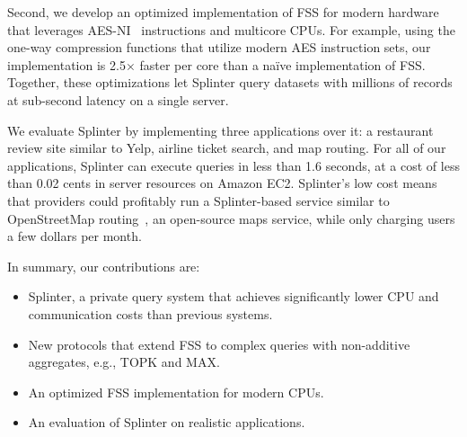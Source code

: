 Second, we develop an optimized implementation of FSS for modern hardware that leverages AES-NI~\cite{aes-ni} instructions and multicore CPUs.
For example, using the one-way compression functions that utilize modern AES instruction sets, our implementation is 2.5$\times$ faster per core than a na\"ive implementation of FSS.
Together, these optimizations let Splinter query datasets with millions of records at sub-second latency on a single server.

We evaluate Splinter by implementing 
three applications over it: a restaurant review site similar to Yelp, 
airline ticket search, and map routing.
For all of our applications, Splinter can execute queries in less than 1.6 seconds, at a cost of less than 0.02 cents in server resources on Amazon EC2.
Splinter's low cost means that providers could profitably run a Splinter-based service
similar to OpenStreetMap routing~\cite{osm}, an open-source maps service, while only charging users a few dollars per month.



In summary, our contributions are:
\begin{itemize}
	\item{Splinter, a private query system that achieves significantly lower CPU and communication costs than previous systems.}
	\item{New protocols that extend FSS to complex queries with non-additive aggregates, e.g., TOPK and MAX.}
	\item{An optimized FSS implementation for modern CPUs.}
	\item{An evaluation of Splinter on realistic applications.}
\end{itemize}
